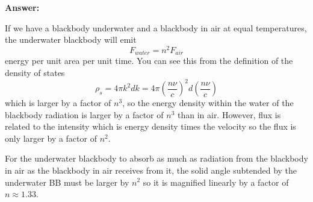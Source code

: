 \documentclass{article}
\begin{document}
\begin{enumerate}
{\bf Answer:}

If we have a blackbody underwater and a blackbody in air at equal temperatures, the underwater blackbody will emit
\begin{equation}
F_{water} = n^2 F_{air}
\end{equation}
energy per unit area per unit time.  You can see this from the definition of the density of states
\begin{equation}
\rho_s = 4\pi k^2 d k = 4\pi \left ( \frac{n \nu}{c} \right )^2 d \left (\frac{n \nu}{c} \right )
\end{equation}
which is larger by a factor of $n^3$, so the energy density within the water of the blackbody radiation is larger by a factor of $n^3$ than in air.   However, flux is related to the intensity which is energy density times the velocity so the flux is only larger by a factor of $n^2$.

For the underwater blackbody to absorb as much as radiation from the
blackbody in air as the blackbody in air receives from it, the solid
angle subtended by the underwater BB must be larger by $n^2$
so it is magnified linearly by a factor of$n\approx 1.33$.
\end{enumerate}

\ifx\bookloaded\undefined
\end{document}
